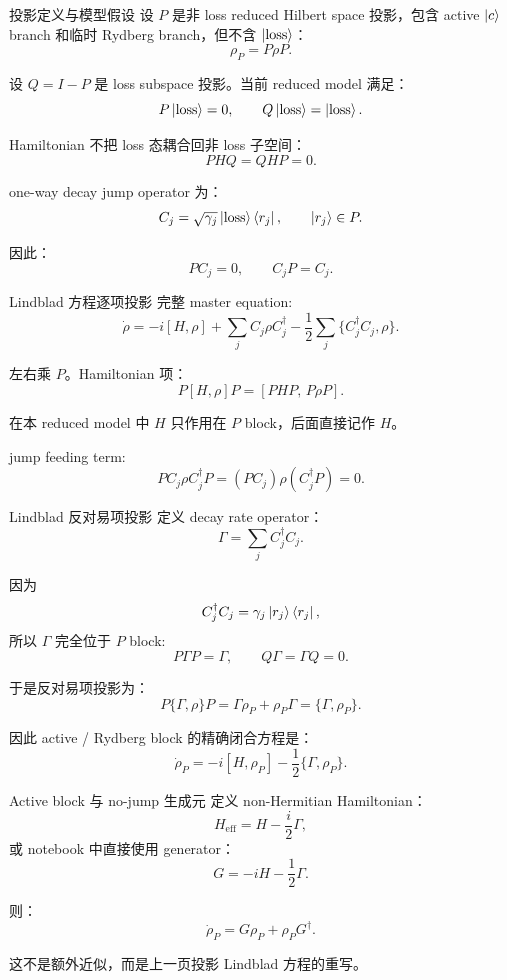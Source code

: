 \documentclass[aspectratio=169,11pt]{ctexbeamer}
\newcommand{\ketc}{\ket{c}}
\newcommand{\ketloss}{\ket{\mathrm{loss}}}
\begin{document}
\begin{frame}{投影定义与模型假设}
  设 \(P\) 是非 loss reduced Hilbert space 投影，包含 active \(\ketc\) branch
  和临时 Rydberg branch，但不含 \(\ketloss\)：
  \[
  \rho_P=P\rho P.
  \]

  设 \(Q=I-P\) 是 loss subspace 投影。当前 reduced model 满足：
  \[
  P\ketloss=0,\qquad Q\ketloss=\ketloss.
  \]

  Hamiltonian 不把 loss 态耦合回非 loss 子空间：
  \[
  PHQ=QHP=0.
  \]

  one-way decay jump operator 为：
  \[
  C_j=\sqrt{\gamma_j}\ketloss\bra{r_j},
  \qquad \ket{r_j}\in P.
  \]

  因此：
  \[
  PC_j=0,\qquad C_jP=C_j.
  \]
\end{frame}

\begin{frame}{Lindblad 方程逐项投影}
  完整 master equation:
  \[
  \dot\rho=-i[H,\rho]
  +\sum_j C_j\rho C_j^\dagger
  -\frac12\sum_j\{C_j^\dagger C_j,\rho\}.
  \]

  左右乘 \(P\)。Hamiltonian 项：
  \[
  P[H,\rho]P
  =
  [PHP,\,P\rho P].
  \]

  在本 reduced model 中 \(H\) 只作用在 \(P\) block，后面直接记作 \(H\)。

  jump feeding term:
  \[
  P C_j\rho C_j^\dagger P
  =
  (PC_j)\rho(C_j^\dagger P)
  =
  0.
  \]
\end{frame}

\begin{frame}{Lindblad 反对易项投影}
  定义 decay rate operator：
  \[
  \Gamma=\sum_j C_j^\dagger C_j.
  \]

  因为
  \[
  C_j^\dagger C_j=\gamma_j\ket{r_j}\bra{r_j},
  \]
  所以 \(\Gamma\) 完全位于 \(P\) block:
  \[
  P\Gamma P=\Gamma,\qquad Q\Gamma=\Gamma Q=0.
  \]

  于是反对易项投影为：
  \[
  P\{\Gamma,\rho\}P
  =
  \Gamma\rho_P+\rho_P\Gamma
  =
  \{\Gamma,\rho_P\}.
  \]

  因此 active / Rydberg block 的精确闭合方程是：
  \[
  \dot\rho_P
  =
  -i[H,\rho_P]-\frac12\{\Gamma,\rho_P\}.
  \]
\end{frame}

\begin{frame}{Active block 与 no-jump 生成元}
  定义 non-Hermitian Hamiltonian：
  \[
  H_{\mathrm{eff}}=H-\frac{i}{2}\Gamma,
  \]
  或 notebook 中直接使用 generator：
  \[
  G=-iH-\frac12\Gamma.
  \]

  则：
  \[
  \dot\rho_P
  =
  G\rho_P+\rho_P G^\dagger.
  \]

  这不是额外近似，而是上一页投影 Lindblad 方程的重写。
\end{frame}
\end{document}

